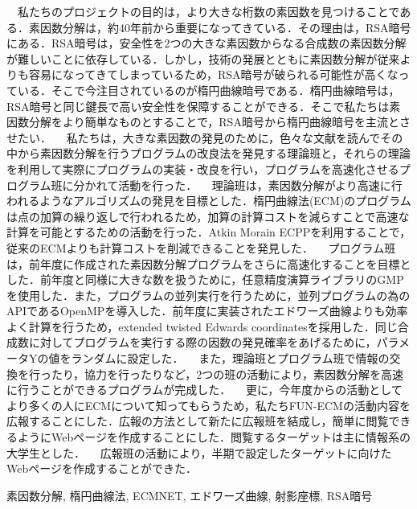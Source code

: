 \documentclass[openany,11pt,papersize]{jsbook}
\begin{document}
\begin{jabstract}
　私たちのプロジェクトの目的は，より大きな桁数の素因数を見つけることである．素因数分解は，約40年前から重要になってきている．その理由は，RSA暗号にある．RSA暗号は，安全性を2つの大きな素因数からなる合成数の素因数分解が難しいことに依存している．しかし，技術の発展とともに素因数分解が従来よりも容易になってきてしまっているため，RSA暗号が破られる可能性が高くなっている．そこで今注目されているのが楕円曲線暗号である．楕円曲線暗号は，RSA暗号と同じ鍵長で高い安全性を保障することができる．そこで私たちは素因数分解をより簡単なものとすることで，RSA暗号から楕円曲線暗号を主流とさせたい．
　私たちは，大きな素因数の発見のために，色々な文献を読んでその中から素因数分解を行うプログラムの改良法を発見する理論班と，それらの理論を利用して実際にプログラムの実装・改良を行い，プログラムを高速化させるプログラム班に分かれて活動を行った．
　理論班は，素因数分解がより高速に行われるようなアルゴリズムの発見を目標とした．楕円曲線法(ECM)のプログラムは点の加算の繰り返しで行われるため，加算の計算コストを減らすことで高速な計算を可能とするための活動を行った．Atkin Morain ECPPを利用することで，従来のECMよりも計算コストを削減できることを発見した．
　プログラム班は，前年度に作成された素因数分解プログラムをさらに高速化することを目標とした．前年度と同様に大きな数を扱うために，任意精度演算ライブラリのGMPを使用した．また，プログラムの並列実行を行うために，並列プログラムの為のAPIであるOpenMPを導入した．前年度に実装されたエドワーズ曲線よりも効率よく計算を行うため，extended twisted Edwards coordinatesを採用した．同じ合成数に対してプログラムを実行する際の因数の発見確率をあげるために，パラメータYの値をランダムに設定した．
　また，理論班とプログラム班で情報の交換を行ったり，協力を行ったりなど，2つの班の活動により，素因数分解を高速に行うことができるプログラムが完成した．
　更に，今年度からの活動としてより多くの人にECMについて知ってもらうため，私たちFUN-ECMの活動内容を広報することにした．広報の方法として新たに広報班を結成し，簡単に閲覧できるようにWebページを作成することにした．閲覧するターゲットは主に情報系の大学生とした．
　広報班の活動により，半期で設定したターゲットに向けたWebページを作成することができた．

\begin{jkeyword}
素因数分解, 楕円曲線法, ECMNET, エドワーズ曲線, 射影座標, RSA暗号
\end{jkeyword}
\end{jabstract}

\end{document}
